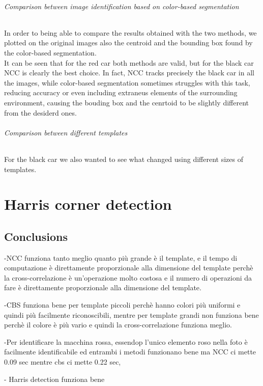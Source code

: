 \subparagraph{Comparison between image identification based on color-based segmentation}
In order to being able to compare the results obtained with the two methods, we plotted on the original images also the centroid and the bounding box found by the 
color-based segmentation.\\ It can be seen that for the red car both methods are valid, but for the black car NCC is clearly the best choice. In fact, NCC tracks precisely the
black car in all the images, while color-based segmentation sometimes struggles with this task, reducing accuracy or even including extraneus elements of the surrounding 
environment, causing the bouding box and the cenrtoid to be slightly different from the desiderd ones.

\subparagraph{Comparison between different templates}
For the black car we also wanted to see what changed using different sizes of templates.





\chapter{Harris corner detection}


\newpage
\section*{Conclusions}


-NCC funziona tanto meglio quanto più grande è il template, e il tempo di computazione è direttamente proporzionale alla dimensione del template perchè la cross-correlazione è un'operazione molto costosa e il numero di operazioni da fare è direttamente proporzionale alla dimensione del template.

-CBS funziona bene per template piccoli perchè hanno colori più uniformi e quindi più facilmente riconoscibili, mentre per template grandi non funziona bene perchè il colore è più vario e quindi la cross-correlazione funziona meglio.

-Per identificare la macchina rossa, essendop l'unico elemento roso nella foto  è facilmente identificabile ed entrambi i metodi funzionano bene ma NCC ci mette 0.09 sec mentre cbs ci mette 0.22 sec, 

- Harris detection funziona bene

